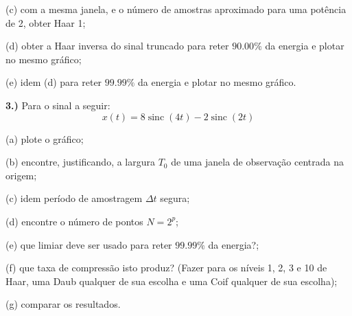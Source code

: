 \documentclass[10pt]{article}
\DeclareMathOperator{\sinc}{sinc}
\begin{document}
(c) com a mesma janela, e o número de amostras aproximado para uma potência de 2, obter Haar 1;

(d) obter a Haar inversa do sinal truncado para reter $90.00\%$ da energia e plotar no mesmo gráfico;

(e) idem (d) para reter $99.99\%$ da energia e plotar no mesmo gráfico.


\vspace{\baselineskip}


\textbf{3.)} Para o sinal a seguir:
\[x(t) = 8\sinc(4t) - 2\sinc(2t)\]

(a) plote o gráfico;

(b) encontre, justificando, a largura $T_0$ de uma janela de observação centrada na origem;

(c) idem período de amostragem $\Delta t$ segura;

(d) encontre o número de pontos $N = 2^p$;

(e) que limiar deve ser usado para reter $99.99\%$ da energia?;

(f) que taxa de compressão isto produz? (Fazer para os níveis 1, 2, 3 e 10 de Haar, uma Daub qualquer de sua escolha e uma Coif qualquer de sua escolha);

(g) comparar os resultados.
\end{document}
